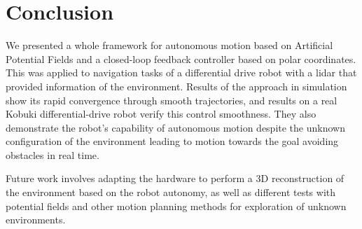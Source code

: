 \documentclass[conference]{IEEEtran}
\begin{document}
\section{Conclusion}
\label{sec:conclusion}
We presented a whole framework for autonomous motion based on Artificial
Potential Fields and a closed-loop feedback controller based on polar
coordinates. This was applied to navigation tasks of a differential drive robot
with a lidar that provided information of the environment. Results of the
approach in simulation show its rapid convergence through smooth trajectories,
and results on a real Kobuki differential-drive robot verify this control
smoothness. They also demonstrate the robot's capability of autonomous motion
despite the unknown configuration of the environment leading to motion towards
the goal avoiding obstacles in real time.

Future work involves adapting the hardware to perform a 3D reconstruction of
the environment based on the robot autonomy, as well as different tests with
potential fields and other motion planning methods for exploration of unknown
environments.



\end{document}
